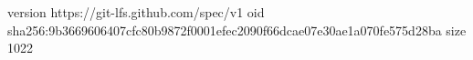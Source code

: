 version https://git-lfs.github.com/spec/v1
oid sha256:9b3669606407cfc80b9872f0001efec2090f66dcae07e30ae1a070fe575d28ba
size 1022
